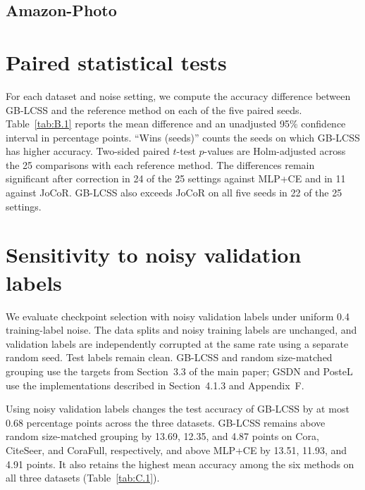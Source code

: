 \documentclass[10pt,letterpaper,nopreprintline]{elsarticle}
\begin{document}


\Needspace{120pt}

\subsection{Amazon-Photo}\label{sec:A.5}



\FloatBarrier

\setcounter{table}{0}

\section{Paired statistical tests}\label{sec:B}

For each dataset and noise setting, we compute the accuracy difference between GB-LCSS and the reference method on each of the five paired seeds. Table~\ref{tab:B.1} reports the mean difference and an unadjusted 95\% confidence interval in percentage points. ``Wins (seeds)'' counts the seeds on which GB-LCSS has higher accuracy. Two-sided paired \(t\)-test \(p\)-values are Holm-adjusted across the 25 comparisons with each reference method. The differences remain significant after correction in 24 of the 25 settings against MLP+CE and in 11 against JoCoR. GB-LCSS also exceeds JoCoR on all five seeds in 22 of the 25 settings.



\FloatBarrier

\setcounter{table}{0}

\section{Sensitivity to noisy validation labels}\label{sec:C}

We evaluate checkpoint selection with noisy validation labels under uniform 0.4 training-label noise. The data splits and noisy training labels are unchanged, and validation labels are independently corrupted at the same rate using a separate random seed. Test labels remain clean. GB-LCSS and random size-matched grouping use the targets from Section~3.3 of the main paper; GSDN and PosteL use the implementations described in Section~4.1.3 and Appendix~F.



Using noisy validation labels changes the test accuracy of GB-LCSS by at most 0.68 percentage points across the three datasets. GB-LCSS remains above random size-matched grouping by 13.69, 12.35, and 4.87 points on Cora, CiteSeer, and CoraFull, respectively, and above MLP+CE by 13.51, 11.93, and 4.91 points. It also retains the highest mean accuracy among the six methods on all three datasets (Table~\ref{tab:C.1}).
\end{document}
